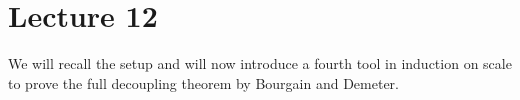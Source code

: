\section*{Lecture 12}
We will recall the setup and will now introduce a fourth tool in induction on scale to prove the full decoupling theorem by Bourgain and Demeter.

